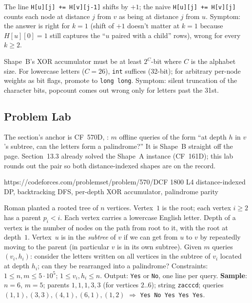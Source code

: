 \begin{warningbox}
The line \lstinline{H[u][j] += H[v][j-1]} shifts by $+1$; the naive
\lstinline{H[u][j] += H[v][j]} counts each node at distance $j$ from
$v$ as being at distance $j$ from $u$. Symptom: the answer is right for
$k=1$ (shift of $+1$ doesn't matter at $k=1$ because $H[u][0]=1$ still
captures the ``$u$ paired with a child'' rows), wrong for every $k\ge 2$.
\end{warningbox}

\begin{warningbox}
Shape~B's XOR accumulator must be at least $2^C$-bit where $C$ is the
alphabet size. For lowercase letters ($C=26$), \lstinline{int} suffices
(32-bit); for arbitrary per-node weights as bit flags, promote to
\lstinline{long long}. Symptom: silent truncation of the character
bits, popcount comes out wrong only for letters past the 31st.
\end{warningbox}

\subsection{Problem Lab}

The section's anchor is CF~570D, : $m$ offline
queries of the form ``at depth $h$ in $v$'s subtree, can the letters
form a palindrome?'' It is Shape~B straight off the page. Section~13.3
already solved the Shape~A instance (CF~161D); this lab rounds out the
pair so both distance-indexed shapes are on the record.

  {https://codeforces.com/problemset/problem/570/D}{CF 1800 L4}
  {distance-indexed DP, backtracking DFS, per-depth XOR accumulator, palindrome parity}

\begin{problemstatement}
Roman planted a rooted tree of $n$ vertices. Vertex~$1$ is the root;
each vertex $i\ge 2$ has a parent $p_i < i$. Each vertex carries a
lowercase English letter. Depth of a vertex is the number of nodes on
the path from root to it, with the root at depth~$1$. Vertex~$u$ is in
the \emph{subtree} of $v$ if we can get from $u$ to $v$ by repeatedly
moving to the parent (in particular $v$ is in its own subtree). Given
$m$ queries $(v_i, h_i)$: consider the letters written on all vertices
in the subtree of $v_i$ located at depth $h_i$; can they be rearranged
into a palindrome? Constraints: $1\le n, m\le 5\cdot 10^{5}$; $1\le
v_i, h_i\le n$. Output: \texttt{Yes} or \texttt{No}, one line per
query. \textbf{Sample}: $n=6$, $m=5$; parents $1,1,1,3,3$ (for
vertices $2..6$); string \texttt{zacccd}; queries
$(1,1),(3,3),(4,1),(6,1),(1,2)$ $\Rightarrow$ \texttt{Yes No Yes Yes
Yes}.
\end{problemstatement}


